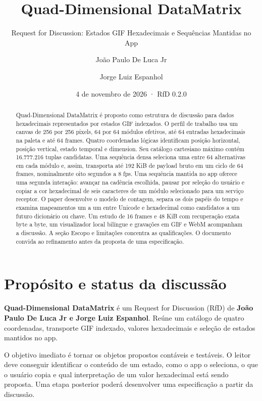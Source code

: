 \documentclass[
  11pt,
  a4paper,
]{article}
\title{Quad-Dimensional DataMatrix}
\subtitle{Request for Discussion: Estados GIF Hexadecimais e Sequências
Mantidas no App}
\author{João Paulo De Luca Jr \and Jorge Luiz Espanhol}
\date{4 de novembro de 2026 · RfD 0.2.0}
\begin{document}
\maketitle
\begin{abstract}
Quad-Dimensional DataMatrix é proposto como estrutura de discussão para
dados hexadecimais representados por estados GIF indexados. O perfil de
trabalho usa um canvas de 256 por 256 pixels, 64 por 64 módulos
efetivos, até 64 entradas hexadecimais na paleta e até 64 frames. Quatro
coordenadas lógicas identificam posição horizontal, posição vertical,
estado temporal e dimension. Seu catálogo cartesiano máximo contém
16.777.216 tuplas candidatas. Uma sequência densa seleciona uma entre 64
alternativas em cada módulo e, assim, transporta até 192 KiB de payload
bruto em um ciclo de 64 frames, nominalmente oito segundos a 8 fps. Uma
sequência mantida no app oferece uma segunda interação: avançar na
cadência escolhida, pausar por seleção do usuário e copiar a cor
hexadecimal de seis caracteres de um módulo selecionado para um serviço
receptor. O paper desenvolve o modelo de contagem, separa os dois papéis
do tempo e examina mapeamentos um a um entre Unicode e hexadecimal como
candidatos a um futuro dicionário ou chave. Um estudo de 16 frames e 48
KiB com recuperação exata byte a byte, um visualizador local bilíngue e
gravações em GIF e WebM acompanham a discussão. A seção Escopo e
limitações concentra as qualificações. O documento convida ao
refinamento antes da proposta de uma especificação.
\end{abstract}

\hypertarget{propuxf3sito-e-status-da-discussuxe3o}{%
\section{Propósito e status da
discussão}\label{propuxf3sito-e-status-da-discussuxe3o}}

\textbf{Quad-Dimensional DataMatrix} é um Request for Discussion (RfD)
de \textbf{João Paulo De Luca Jr e Jorge Luiz Espanhol}. Reúne um
catálogo de quatro coordenadas, transporte GIF indexado, valores
hexadecimais e seleção de estados mantidos no app.

O objetivo imediato é tornar os objetos propostos contáveis e testáveis.
O leitor deve conseguir identificar o conteúdo de um estado, como o app
o seleciona, o que o usuário copia e qual interpretação de um valor
hexadecimal está sendo proposta. Uma etapa posterior poderá desenvolver
uma especificação a partir da discussão.
\end{document}
